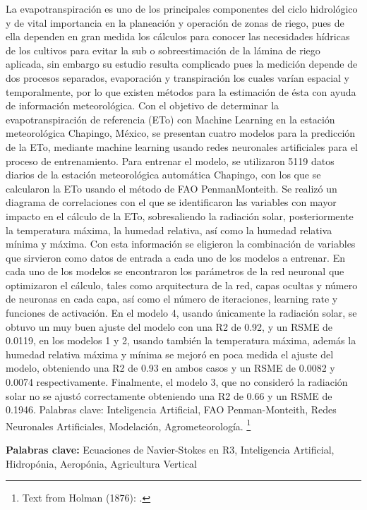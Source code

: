 %
%

La evapotranspiración es uno de los principales componentes del ciclo
hidrológico y de vital importancia en la planeación y operación de zonas de riego,
pues de ella dependen en gran medida los cálculos para conocer las necesidades
hídricas de los cultivos para evitar la sub o sobreestimación de la lámina de riego
aplicada, sin embargo su estudio resulta complicado pues la medición depende
de dos procesos separados, evaporación y transpiración los cuales varían
espacial y temporalmente, por lo que existen métodos para la estimación de ésta
con ayuda de información meteorológica.
Con el objetivo de determinar la evapotranspiración de referencia (ETo) con
Machine Learning en la estación meteorológica Chapingo, México, se presentan
cuatro modelos para la predicción de la ETo, mediante machine learning usando
redes neuronales artificiales para el proceso de entrenamiento. Para entrenar el
modelo, se utilizaron 5119 datos diarios de la estación meteorológica automática
Chapingo, con los que se calcularon la ETo usando el método de FAO PenmanMonteith.
Se realizó un diagrama de correlaciones con el que se identificaron las variables
con mayor impacto en el cálculo de la ETo, sobresaliendo la radiación solar,
posteriormente la temperatura máxima, la humedad relativa, así como la
humedad relativa mínima y máxima. Con esta información se eligieron la
combinación de variables que sirvieron como datos de entrada a cada uno de los
modelos a entrenar.
En cada uno de los modelos se encontraron los parámetros de la red neuronal
que optimizaron el cálculo, tales como arquitectura de la red, capas ocultas y
número de neuronas en cada capa, así como el número de iteraciones, learning
rate y funciones de activación.
En el modelo 4, usando únicamente la radiación solar, se obtuvo un muy buen
ajuste del modelo con una R2 de 0.92, y un RSME de 0.0119, en los modelos 1 y
2, usando también la temperatura máxima, además la humedad relativa máxima
y mínima se mejoró en poca medida el ajuste del modelo, obteniendo una R2 de
0.93 en ambos casos y un RSME de 0.0082 y 0.0074 respectivamente.
Finalmente, el modelo 3, que no consideró la radiación solar no se ajustó
correctamente obteniendo una R2 de 0.66 y un RSME de 0.1946.
Palabras clave: Inteligencia Artificial, FAO Penman-Monteith, Redes Neuronales
Artificiales, Modelación, Agrometeorología. \footnote{Text from Holman (1876): .}  


\textbf{Palabras clave:} Ecuaciones de Navier-Stokes en R3, Inteligencia Artificial, Hidropónia, Aeropónia, Agricultura Vertical